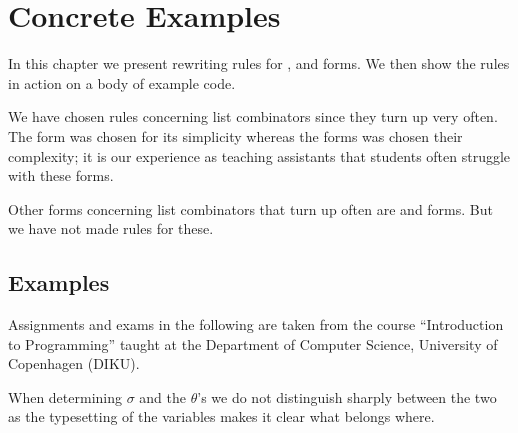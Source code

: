 \chapter{Concrete Examples}
\label{chap:concrete-examples}
In this chapter we present rewriting rules for ,  and
 forms. We then show the rules in action on a body of example code.

We have chosen rules concerning list combinators since they turn up very
often. The  form was chosen for its simplicity whereas the
 forms was chosen their complexity; it is our experience as
teaching assistants that students often struggle with these forms.

Other forms concerning list combinators that turn up often are  and
 forms. But we have not made rules for these.



\section{Examples}
Assignments and exams in the following are taken from the course ``Introduction
to Programming'' taught at the Department of Computer Science, University of
Copenhagen (DIKU).

When determining $\sigma$ and the $\theta$'s we do not distinguish sharply
between the two as the typesetting of the variables makes it clear what belongs
where.





